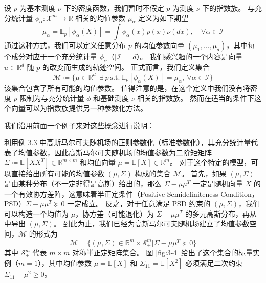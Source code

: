 设 $p$ 为基本测度 $\nu$ 下的密度函数，我们暂时不假定 $p$ 为测度 $\nu$ 下的指数族。
与充分统计量 $\phi_{\alpha}: \mathcal{X}^m \rightarrow \mathbb{R}$ 相关的均值参数 $\mu_{\alpha}$ 定义为如下期望
\begin{equation}
    \mu_{\alpha} = \mathbb{E}_p[\phi_{\alpha}(X)] = \int \phi_{\alpha}(x)p(x)\nu(dx), \quad \forall \alpha \in \mathcal{I}
\end{equation}
通过这种方式，我们可以定义任意分布 $p$ 的均值参数向量 $(\mu_1, \dots, \mu_d)$，其中每个成分对应于一个充分统计量 $\phi_{\alpha}$（$|\mathcal{I}| = d$）。
我们感兴趣的一个内容是向量 $u \in \mathbb{R}^d$ 随 $p$ 的改变而生成的轨迹空间。
正式而言，我们定义集合
\begin{equation}
    \mathcal{M} \coloneqq \{\mu \in \mathbb{R}^d| ~\exists ~p ~\text{s.t.} ~\mathbb{E}_p[\phi_{\alpha}(X)] = \mu_{\alpha}, ~\forall \alpha \in \mathcal{I}\}
\end{equation}
该集合包含了所有可能的均值参数。
值得注意的是，在这个定义中我们没有将密度 $p$ 限制为与充分统计量 $\phi$ 和基础测度 $\nu$ 相关的指数族。
然而在适当的条件下这个向量可以为指数族提供另一种参数化方法。

我们沿用前面一个例子来对这些概念进行说明：

\begin{tcolorbox}
\begin{exam}

利用例 3.3 中高斯马尔可夫随机场的正则参数化（标准参数化），其充分统计量代表了均值参数，因此高斯马尔可夫随机场的均值参数为二阶矩矩阵 $\Sigma \coloneqq \mathbb{E}[XX^T] \in \mathbb{R}^{m \times m}$ 和均值向量 $\mu = \mathbb{E}[X] \in \mathbb{R}^m$。
对于这个特定的模型，可以直接给出所有可能的均值参数 $(\mu, \Sigma)$ 构成的集合 $\mathcal{M}$。
首先，如果 $(\mu, \Sigma)$ 是由某种分布（不一定非得是高斯）给出的，那么 $\Sigma - \mu\mu^T$ 一定是随机向量 $X$ 的一个有效协方差阵，这意味着半正定条件（Positive Semidefiniteness Condition，PSD）$\Sigma - \mu\mu^T \succeq 0$ 一定成立。
反之，对于任意满足 PSD 约束的 $(\mu, \Sigma)$，我们可以构造一个均值为 $\mu$，协方差（可能退化）为 $\Sigma - \mu\mu^T$ 的多元高斯分布，再从中导出 $(\mu, \Sigma)$。
到此为止，我们已经为高斯马尔可夫随机场建立了均值参数空间，$\mathcal{M}$ 的形式为
\begin{equation}
    \mathcal{M} = \{(\mu, \Sigma) \in \mathbb{R}^m \times \mathcal{S}_+^m| \Sigma - \mu\mu^T \succeq 0\}
\end{equation}
其中 $\mathcal{S}_+^m$ 代表 $m \times m$ 对称半正定矩阵集合。
图 \ref{fig:3-4} 给出了这个集合的标量实例（$m = 1$），其中均值参数 $\mu = \mathbb{E}[X]$ 和 $\Sigma_{11} = \mathbb{E}[X^2]$ 必须满足二次约束 $\Sigma_{11} - \mu^2 \geq 0$。

\end{exam}
\end{tcolorbox}

